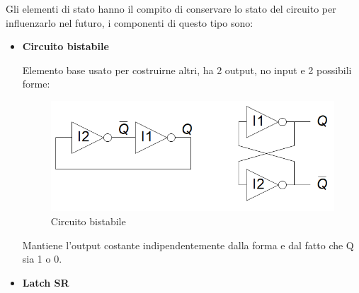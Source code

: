 \documentclass{article}
\begin{document}
Gli elementi di stato hanno il compito di conservare lo stato del circuito per influenzarlo nel futuro, i componenti di questo tipo sono:

\begin{itemize}
    \item \textbf{Circuito bistabile}

    Elemento base usato per costruirne altri, ha 2 output, no input e 2 possibili forme:

    \begin{figure}[ht]
        \centering
        \includegraphics[width=0.8\linewidth]{bistable.png}
        \caption{Circuito bistabile}
        \label{fig:bistable}
    \end{figure}

    Mantiene l'output costante indipendentemente dalla forma e dal fatto che Q sia 1 o 0.

    \vspace{5pt}

    \item \textbf{Latch SR}


\end{itemize}
\end{document}
